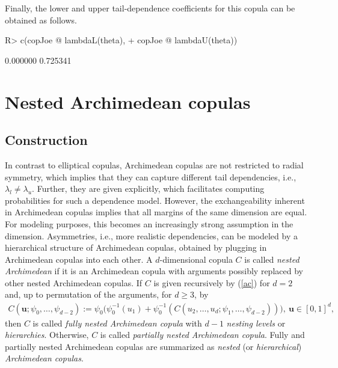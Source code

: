 \documentclass[nojss,article]{jss}
\theoremstyle{mythmstyle}
\newcommand*{\psiis}[1]{{\psi_{#1}^{-1}}}
\begin{document}
Finally, the lower and upper tail-dependence coefficients for this copula can be
obtained as follows.
\begin{Schunk}
\begin{Sinput}
R> c(copJoe @ lambdaL(theta),
+    copJoe @ lambdaU(theta))
\end{Sinput}
\begin{Soutput}
[1] 0.000000 0.725341
\end{Soutput}
\end{Schunk}

\section{Nested Archimedean copulas}
\subsection{Construction}
In contrast to elliptical copulas, Archimedean copulas are not restricted to
radial symmetry, which implies that they can capture different tail
dependencies, i.e., $\lambda_l\neq\lambda_u$. Further, they are given
explicitly, which facilitates computing probabilities for such a dependence
model. However, the exchangeability inherent in Archimedean copulas implies that
all margins of the same dimension are equal. For modeling purposes, this
becomes an increasingly strong assumption in the dimension. Asymmetries, i.e.,
more realistic dependencies, can be modeled by a hierarchical structure of
Archimedean copulas, obtained by plugging in Archimedean copulas into each
other. A $d$-dimensional copula $C$ is called \textit{nested Archimedean} if it
is an Archimedean copula with arguments possibly replaced by other nested
Archimedean copulas. If $C$ is given recursively by (\ref{ac}) for $d=2$ and,
up to permutation of the arguments, for $d\ge 3$, by
\begin{align}
  C(\bm{u};\psi_0,\dots,\psi_{d-2}) := \psi_0\bigl(\psiis{0}(u_1)+
  \psiis{0}(C(u_2,\dots,u_d;\psi_{1},\dots,\psi_{d-2}))\bigr),
  \ \bm{u}\in[0,1]^d,\label{nac}
\end{align}
then $C$ is called \textit{fully nested Archimedean copula} with
$d-1$ \textit{nesting levels} or \textit{hierarchies}. Otherwise, $C$ is
called \textit{partially nested Archimedean copula}. Fully and partially
nested Archimedean copulas are summarized as \textit{nested} (or
\textit{hierarchical}) \textit{Archimedean copulas}.
\end{document}
